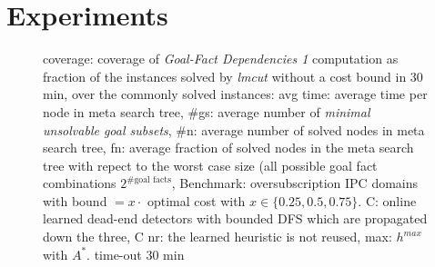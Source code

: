 


\newcommand{\scatterplotsize}{8cm}
\newcommand{\scatterplotxlabelshift}{1.5ex}
\newcommand{\scatterplotylabelshift}{-3ex}

\section{Experiments}






\setlength{\tabcolsep}{1pt}
\renewcommand{\arraystretch}{0.8}
\begin{figure}[ht]
	\centering  \caption{ coverage:
	coverage of \emph{Goal-Fact Dependencies 1} computation as
	fraction of the instances solved by \emph{lmcut} without a
	cost bound in 30 min, over the commonly solved instances: avg
	time: average time per node in meta search tree, \#gs: average
	number of \emph{minimal unsolvable goal subsets}, \#n: average
	number of solved nodes in meta search tree, fn: average
	fraction of solved nodes in the meta search tree with repect
	to the worst case size (all possible goal fact combinations
	$2^{\text{\# goal facts}}$, Benchmark: oversubscription IPC
	domains with bound $ = x \cdot $ optimal cost with $
	x \in \{0.25, 0.5, 0.75\}$.  C: online learned dead-end
	detectors with bounded DFS which are propagated down the
	three, C nr: the learned heuristic is not reused, max:
	$h^{max}$ with $A^*$.  time-out 30 min}
\end{figure}



